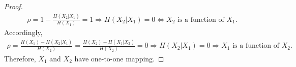 \documentclass{assignment}
\begin{document}
\begin{sol}
\begin{itemize}
        \begin{proof}
            \begin{align}
                \rho=1-\frac{H(X_2\vert X_1)}{H(X_1)}=1\Longrightarrow H(X_2\vert X_1)=0\Longleftrightarrow X_2\text{ is a function of }X_1.
            \end{align}
            Accordingly,
            \begin{align}
                \rho=\frac{H(X_1)-H(X_2\vert X_1)}{H(X_2)}=\frac{H(X_2)-H(X_1\vert X_2)}{H(X_2)}=0\Rightarrow H(X_2\vert X_1)=0\Longrightarrow X_1\text{ is a function of }X_2.
            \end{align}
            Therefore, $X_1$ and $X_2$ have one-to-one mapping.
        \end{proof}
    \end{itemize}
\end{sol}
\end{document}
